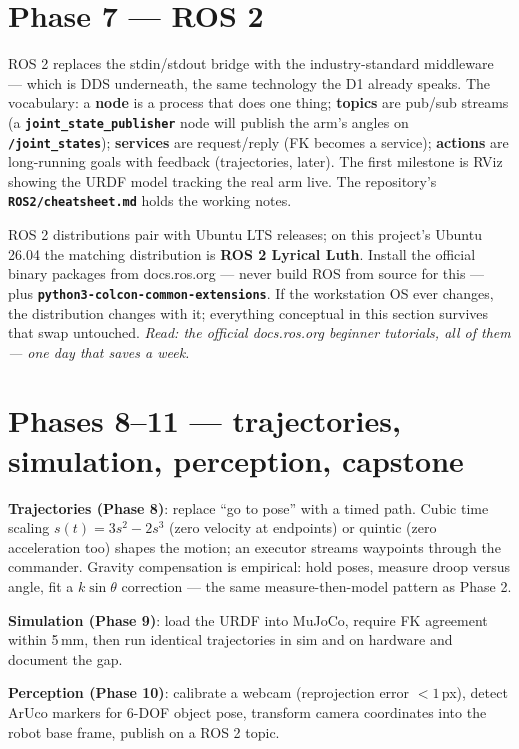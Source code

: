 \documentclass[11pt,twoside,openright]{book}
\newcommand{\code}[1]{\texttt{\bfseries #1}}
\begin{document}
\section{Phase 7 --- ROS 2}

ROS 2 replaces the stdin/stdout bridge with the industry-standard
middleware --- which is DDS underneath, the same technology the D1
already speaks. The vocabulary: a \textbf{node} is a process that does
one thing; \textbf{topics} are pub/sub streams (a
\code{joint\_state\_publisher} node will publish the arm's angles on
\code{/joint\_states}); \textbf{services} are request/reply (FK becomes a
service); \textbf{actions} are long-running goals with feedback
(trajectories, later). The first milestone is RViz showing the URDF model
tracking the real arm live. The repository's \code{ROS2/cheatsheet.md}
holds the working notes.

ROS 2 distributions pair with Ubuntu LTS releases; on this project's
Ubuntu 26.04 the matching distribution is \textbf{ROS 2 Lyrical Luth}.
Install the official binary packages from docs.ros.org --- never build
ROS from source for this --- plus
\code{python3-colcon-common-extensions}. If the workstation OS ever
changes, the distribution changes with it; everything conceptual in this
section survives that swap untouched. \emph{Read: the official
docs.ros.org beginner tutorials, all of them --- one day that saves a
week.}

\section{Phases 8--11 --- trajectories, simulation, perception, capstone}

\textbf{Trajectories (Phase 8)}: replace ``go to pose'' with a timed
path. Cubic time scaling $s(t)=3s^2-2s^3$ (zero velocity at endpoints) or
quintic (zero acceleration too) shapes the motion; an executor streams
waypoints through the commander. Gravity compensation is empirical: hold
poses, measure droop versus angle, fit a $k\sin\theta$ correction ---
the same measure-then-model pattern as Phase 2.

\textbf{Simulation (Phase 9)}: load the URDF into MuJoCo, require FK
agreement within 5\,mm, then run identical trajectories in sim and on
hardware and document the gap.

\textbf{Perception (Phase 10)}: calibrate a webcam
(reprojection error $<1$\,px), detect ArUco markers for 6-DOF object
pose, transform camera coordinates into the robot base frame, publish on
a ROS 2 topic.
\end{document}
